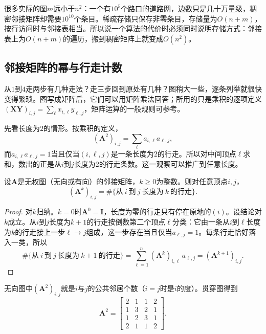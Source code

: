 很多实际的图$m$远小于$n^2$：一个有$10^5$个路口的道路网，边数只是几十万量级，稠密邻接矩阵却需要$10^{10}$个条目。稀疏存储只保存非零条目，存储量为$O(n+m)$，按行访问时与邻接表相当。所以说一个算法的代价时必须同时说明存储方式：邻接表上为$O(n+m)$的遍历，搬到稠密矩阵上就变成$O(n^2)$。

\subsection{邻接矩阵的幂与行走计数}
\label{sec:graph-conn-adjacency-powers}

从$1$到$4$走两步有几种走法？走三步回到原处有几种？图稍大一些，逐条列举就很快变得繁琐。图写成矩阵后，它们可以用矩阵乘法回答；所用的只是乘积的逐项定义$(\bm X\bm Y)_{i,j}=\sum_\ell x_{i,\ell}y_{\ell,j}$，矩阵运算的一般规则可参考。

先看长度为$2$的情形。按乘积的定义，
\[
(\bm A^2)_{i,j}=\sum_{\ell}a_{i,\ell}a_{\ell,j},
\]
而$a_{i,\ell}a_{\ell,j}=1$当且仅当$(i,\ell,j)$是一条长度为$2$的行走。所以对中间顶点$\ell$求和，数出的正是从$i$到$j$长度为$2$的行走条数。这一观察可以推广到任意长度。

\begin{theorem}[邻接矩阵的幂计数行走]
\label{thm:graph-conn-adjacency-powers}
设$\bm A$是无权图（无向或有向）的邻接矩阵，$k\geq0$为整数。则对任意顶点$i,j$，
\begin{equation}
(\bm A^k)_{i,j}=\#\{\text{从}\ i\ \text{到}\ j\ \text{长度为}\ k\ \text{的行走}\}.
\label{eq:graph-conn-adjacency-power-walks}
\end{equation}
\end{theorem}

\begin{proof}
对$k$归纳。$k=0$时$\bm A^0=\bm I$，长度为零的行走只有停在原地的$(i)$。设结论对$k$成立。从$i$到$j$长度为$k+1$的行走按倒数第二个顶点$\ell$分类：它由一条从$i$到$\ell$长度为$k$的行走接上一步$\ell\to j$组成，这一步存在当且仅当$a_{\ell,j}=1$。每条行走恰好落入一类，所以
\[
\#\{\text{从}\ i\ \text{到}\ j\ \text{长度为}\ k+1\ \text{的行走}\}
=\sum_{\ell=1}^{n}(\bm A^k)_{i,\ell}\,a_{\ell,j}
=(\bm A^{k+1})_{i,j}.
\]
\end{proof}

无向图中$(\bm A^2)_{i,j}$就是$i$与$j$的公共邻居个数（$i=j$时是$i$的度）。贯穿图得到
\[
\bm A^2=
\begin{bmatrix}
2&1&1&2\\
1&3&2&1\\
1&2&3&1\\
2&1&1&2
\end{bmatrix}.
\]

